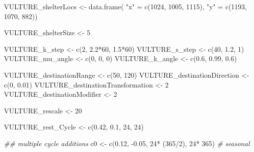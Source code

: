 \documentclass[10pt,a4paper]{article}
\newenvironment{Shaded}{}{}
\newcommand{\CommentTok}[1]{\textit{#1}}
\newcommand{\DecValTok}[1]{#1}
\newcommand{\DocumentationTok}[1]{\textit{#1}}
\newcommand{\FloatTok}[1]{#1}
\newcommand{\FunctionTok}[1]{#1}
\newcommand{\NormalTok}[1]{#1}
\newcommand{\OtherTok}[1]{#1}
\newcommand{\SpecialCharTok}[1]{#1}
\newcommand{\StringTok}[1]{#1}
\begin{document}
\begin{Shaded}
\begin{Highlighting}[]
\NormalTok{VULTURE\_shelterLocs }\OtherTok{\textless{}{-}} \FunctionTok{data.frame}\NormalTok{(}
  \StringTok{"x"} \OtherTok{=} \FunctionTok{c}\NormalTok{(}\DecValTok{1024}\NormalTok{, }\DecValTok{1005}\NormalTok{, }\DecValTok{1115}\NormalTok{),}
  \StringTok{"y"} \OtherTok{=} \FunctionTok{c}\NormalTok{(}\DecValTok{1193}\NormalTok{, }\DecValTok{1070}\NormalTok{, }\DecValTok{882}\NormalTok{))}

\NormalTok{VULTURE\_shelterSize }\OtherTok{\textless{}{-}} \DecValTok{5}


\NormalTok{VULTURE\_k\_step }\OtherTok{\textless{}{-}} \FunctionTok{c}\NormalTok{(}\DecValTok{2}\NormalTok{, }\FloatTok{2.2}\SpecialCharTok{*}\DecValTok{60}\NormalTok{, }\FloatTok{1.5}\SpecialCharTok{*}\DecValTok{60}\NormalTok{)}
\NormalTok{VULTURE\_s\_step }\OtherTok{\textless{}{-}} \FunctionTok{c}\NormalTok{(}\DecValTok{40}\NormalTok{, }\FloatTok{1.2}\NormalTok{, }\DecValTok{1}\NormalTok{)}
\NormalTok{VULTURE\_mu\_angle }\OtherTok{\textless{}{-}} \FunctionTok{c}\NormalTok{(}\DecValTok{0}\NormalTok{, }\DecValTok{0}\NormalTok{, }\DecValTok{0}\NormalTok{)}
\NormalTok{VULTURE\_k\_angle }\OtherTok{\textless{}{-}} \FunctionTok{c}\NormalTok{(}\FloatTok{0.6}\NormalTok{, }\FloatTok{0.99}\NormalTok{, }\FloatTok{0.6}\NormalTok{)}

\NormalTok{VULTURE\_destinationRange }\OtherTok{\textless{}{-}} \FunctionTok{c}\NormalTok{(}\DecValTok{50}\NormalTok{, }\DecValTok{120}\NormalTok{)}
\NormalTok{VULTURE\_destinationDirection }\OtherTok{\textless{}{-}} \FunctionTok{c}\NormalTok{(}\DecValTok{0}\NormalTok{, }\FloatTok{0.01}\NormalTok{)}
\NormalTok{VULTURE\_destinationTransformation }\OtherTok{\textless{}{-}} \DecValTok{2}
\NormalTok{VULTURE\_destinationModifier }\OtherTok{\textless{}{-}} \DecValTok{2}

\NormalTok{VULTURE\_rescale }\OtherTok{\textless{}{-}} \DecValTok{20}


\NormalTok{VULTURE\_rest\_Cycle }\OtherTok{\textless{}{-}} \FunctionTok{c}\NormalTok{(}\FloatTok{0.42}\NormalTok{, }\FloatTok{0.1}\NormalTok{, }\DecValTok{24}\NormalTok{, }\DecValTok{24}\NormalTok{)}

\DocumentationTok{\#\# multiple cycle additions}
\NormalTok{c0 }\OtherTok{\textless{}{-}} \FunctionTok{c}\NormalTok{(}\FloatTok{0.12}\NormalTok{, }\SpecialCharTok{{-}}\FloatTok{0.05}\NormalTok{, }\DecValTok{24}\SpecialCharTok{*}\NormalTok{ (}\DecValTok{365}\SpecialCharTok{/}\DecValTok{2}\NormalTok{), }\DecValTok{24}\SpecialCharTok{*} \DecValTok{365}\NormalTok{) }\CommentTok{\# seasonal}


\end{Highlighting}
\end{Shaded}
\end{document}
